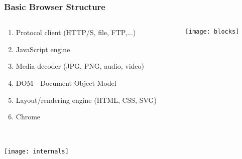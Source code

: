 \documentclass[
	notes=none,
	aspectratio=169
]{beamer}
\begin{document}
\begin{frame}
\frametitle{Basic Browser Structure}

\begin{columns}[T]
\begin{column}[T]{0.66\textwidth}
\setlength{\parskip}{0.5em}

\vspace{1.5cm}
\begin{enumerate}
\setlength{\parskip}{0.5em}
\item Protocol client (HTTP/S, file, FTP,...)
\item JavaScript engine
\item Media decoder (JPG, PNG, audio, video)
\item DOM - Document Object Model
\item Layout/rendering engine (HTML, CSS, SVG)
\item Chrome
\end{enumerate}

\end{column}
\begin{column}[T]{0.34\textwidth}
\setlength{\parskip}{0.5em}

\vspace{-0.2cm}
\texttt{[image: blocks]}

\end{column}
\end{columns}

\end{frame}
\note{
}


\begin{frame}
\frametitle{}

\begin{columns}[T]
\begin{column}[T]{1.0\textwidth}

\vspace{0.2cm}
\texttt{[image: internals]}

\end{column}
\end{columns}

\end{frame}
\note{
}

\end{document}
